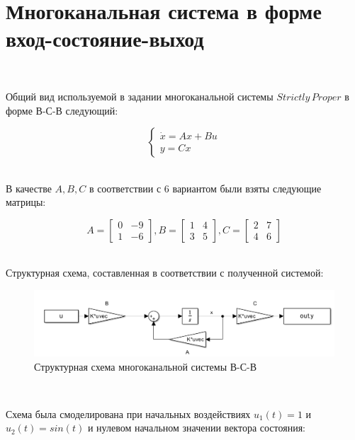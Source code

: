 \documentclass[a4paper]{article}
\begin{document}
\section{Многоканальная система в форме вход-состояние-выход}\

Общий вид используемой в задании многоканальной системы $Strictly\, Proper$ в форме В-С-В следующий:

$$
\begin{cases}
    \dot{x}=Ax+Bu \\
    y = Cx
\end{cases}
$$\ 

В качестве $A, B, C$ в соответствии с 6 вариантом были взяты следующие матрицы:

$$
A = \begin{bmatrix}
    0 & -9 \\ 
    1 & -6
\end{bmatrix}, B = \begin{bmatrix}
    1 & 4 \\
    3 & 5
\end{bmatrix}, C = \begin{bmatrix}
    2 & 7 \\ 
    4 & 6
\end{bmatrix}
$$\ 

Структурная схема, составленная в соответствии с полученной системой:

\begin{figure}[H]
    \centering
    \includegraphics[width=0.65\linewidth]{ex4/scheme.png}
    \caption{Структурная схема многоканальной системы В-С-В}
\end{figure}\ 

Схема была смоделирована при начальных воздействиях $u_1(t) = 1$ и $u_2(t) = sin(t)$ и нулевом начальном значении вектора состояния:
\end{document}
